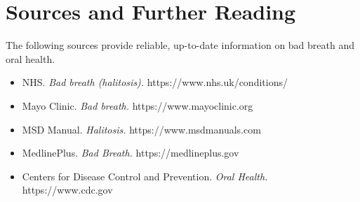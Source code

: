 \section*{Sources and Further Reading}
The following sources provide reliable, up-to-date information on bad breath and oral health.
\begin{itemize}
    \item NHS. \textit{Bad breath (halitosis).} https://www.nhs.uk/conditions/
    \item Mayo Clinic. \textit{Bad breath.} https://www.mayoclinic.org
    \item MSD Manual. \textit{Halitosis.} https://www.msdmanuals.com
    \item MedlinePlus. \textit{Bad Breath.} https://medlineplus.gov
    \item Centers for Disease Control and Prevention. \textit{Oral Health.} https://www.cdc.gov
\end{itemize}
